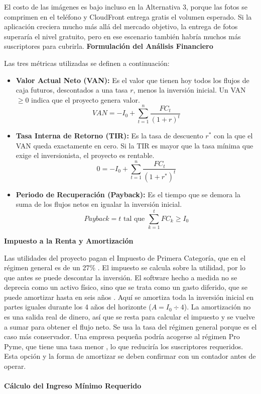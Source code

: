 El costo de las imágenes es bajo incluso en la Alternativa 3, porque las fotos se comprimen en el teléfono y CloudFront entrega gratis el volumen esperado. Si la aplicación creciera mucho más allá del mercado objetivo, la entrega de fotos superaría el nivel gratuito, pero en ese escenario también habría muchos más suscriptores para cubrirla.
\newpage
\textbf{Formulación del Análisis Financiero}

Las tres métricas utilizadas se definen a continuación:

\begin{itemize}
    \item \textbf{Valor Actual Neto (VAN):} Es el valor que tienen hoy todos los flujos de caja futuros, descontados a una tasa $r$, menos la inversión inicial. Un VAN $\geq 0$ indica que el proyecto genera valor.
    \begin{equation}
        VAN = -I_0 + \sum_{t=1}^{n} \frac{FC_t}{(1+r)^t}
    \end{equation}

    \item \textbf{Tasa Interna de Retorno (TIR):} Es la tasa de descuento $r^*$ con la que el VAN queda exactamente en cero. Si la TIR es mayor que la tasa mínima que exige el inversionista, el proyecto es rentable.
    \begin{equation}
        0 = -I_0 + \sum_{t=1}^{n} \frac{FC_t}{(1+r^*)^t}
    \end{equation}

    \item \textbf{Periodo de Recuperación (Payback):} Es el tiempo que se demora la suma de los flujos netos en igualar la inversión inicial.
    \begin{equation}
        Payback = t \text{ tal que } \sum_{k=1}^{t} FC_k \geq I_0
    \end{equation}
\end{itemize}

\textbf{Impuesto a la Renta y Amortización}

Las utilidades del proyecto pagan el Impuesto de Primera Categoría, que en el régimen general es de un 27\% \citep{sii_tasas}. El impuesto se calcula sobre la utilidad, por lo que antes se puede descontar la inversión. El software hecho a medida no se deprecia como un activo físico, sino que se trata como un gasto diferido, que se puede amortizar hasta en seis años \citep{sii_software}. Aquí se amortiza toda la inversión inicial en partes iguales durante los 4 años del horizonte ($A = I_0 \div 4$). La amortización no es una salida real de dinero, así que se resta para calcular el impuesto y se vuelve a sumar para obtener el flujo neto.
\newpage
Se usa la tasa del régimen general porque es el caso más conservador. Una empresa pequeña podría acogerse al régimen Pro Pyme, que tiene una tasa menor \citep{sii_tasas}, lo que reduciría los suscriptores requeridos. Esta opción y la forma de amortizar se deben confirmar con un contador antes de operar.
\\\\
\textbf{Cálculo del Ingreso Mínimo Requerido}

